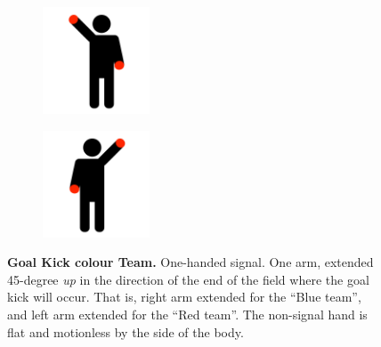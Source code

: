         \begin{figure}[ht!]
            \centering
            \begin{subfigure}{.33\textwidth}
                \includegraphics[height=120px]{figs/referee-signals/goal-kick.png}
            \end{subfigure}
            \begin{subfigure}{.33\textwidth}
                \includegraphics[height=120px]{figs/referee-signals/goal-kick-flipped.png}
            \end{subfigure}
            \caption{\textbf{Goal Kick \textlangle{}colour\textrangle{} Team.}
            One-handed signal. One arm, extended 45-degree \emph{up} in the direction of the end of the field where the goal kick will occur. That is, right arm extended for the ``Blue team'', and left arm extended for the ``Red team''. The non-signal hand is flat and motionless by the side of the body.}
        \end{figure}

